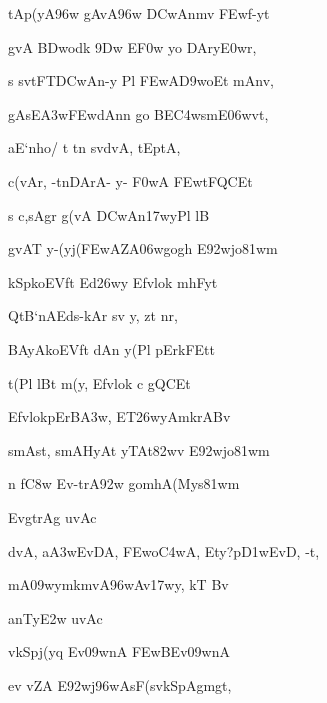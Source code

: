 {\dn {}tAp(yA\396w gAvA\396w \3DCwAnm\?v \3FEwf-yt\? \vegdn\dontdisplaylinenum}

{\dn gvA\2 \3BDwodk\2 \39Dw E\3F0w\0 yo DAry\?\3E0wr,{\dandabdn} \dontdisplaylinenum}

{\dn s sv\0tFT\0\3DCwAn-y Pl\2 \3FEwA\3D9woEt mAnv, \vegdn\dontdisplaylinenum}

{\dn g\5AsE\3A3w\3FEwdAn\?n go BE\3C4wsmE\306wvt,{\dandabdn} \dontdisplaylinenum}

{\dn aE`nho/\2 t\2 t\?n sv\0d\?vA, tEp\0tA, \vegdn\dontdisplaylinenum}

{\dn c(vAr, -tnDArA- y- \3F0wA\0 \3FEwtFQCEt{\dandabdn} \dontdisplaylinenum}

{\dn s c,sAgr\2 g(vA \3DCwAn\317wyPl\2 lB\? \vegdn\dontdisplaylinenum}

{\dn gvAT{\rdt} y-(yj\?(\3FEwAZA\306wgog\5h\? E\392wjo\381wm{\dandabdn} \dontdisplaylinenum}

{\dn kSpkoEVft\2 Ed\326wy\2 Efvlok\? mhFyt\? \vegdn\dontdisplaylinenum}

{\dn QtB`nAEds\2-kAr\2 sv{\rdt} y, zt\? nr,{\dandabdn} \dontdisplaylinenum}

{\dn BAyA\0koEVft\2 dAn\2 y(Pl\2 pErkFEt\0t \vegdn\dontdisplaylinenum }

{\dn t(Pl\2 lBt\? m(y\0, Efvlok\2 c gQCEt{\dandabdn} \dontdisplaylinenum}

{\dn EfvlokpErB\5\3A3w, ET\326wyAm\?krABv\? \vegdn\dontdisplaylinenum}

{\dn smAst, smAHyAt\2 yTAt\382wv\2 E\392wjo\381wm{\dandabdn} \dontdisplaylinenum}

{\dn n f\3C8w\2 Ev-trA\392w\2 gomhA(Mys\381wm \vegdn\dontdisplaylinenum}

{\dn EvgtrAg uvAc{\dandabdn}\dontdisplaylinenum }

{\dn d\?vA,  a\3A3wEvDA, \3FEwo\3C4wA, Ety\0?p\3D1wEvD, -t,{\dandadn} \dontdisplaylinenum}

{\dn mA\309wym\?km\?vA\396wAv\0\317wy\0, kT\2 Bv\? \vegdn\dontdisplaylinenum}

{\dn anT\0y\3E2w uvAc{\dandabdn}\dontdisplaylinenum }

{\dn {}v\0kSpj(y\?q Ev\309wnA \3FEwBEv\309wnA{\dandadn} \dontdisplaylinenum}

{\dn ev\2 vZA\0 E\392wj\396wAsF(sv\0kSpAg\5mg\5t, \vegdn\dontdisplaylinenum}

